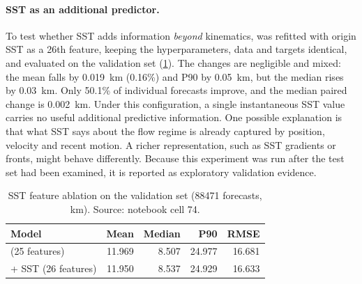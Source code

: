 \paragraph{SST as an additional predictor.} To test whether SST adds information \emph{beyond} kinematics, \GBH{} was refitted with origin SST as a 26th feature, keeping the hyperparameters, data and targets identical, and evaluated on the validation set (\cref{tab:sst}). The changes are negligible and mixed: the mean falls by \SI{0.019}{km} (0.16\%) and P90 by \SI{0.05}{km}, but the median rises by \SI{0.03}{km}. Only 50.1\% of individual forecasts improve, and the median paired change is \SI{0.002}{km}. Under this configuration, a single instantaneous SST value carries no useful additional predictive information. One possible explanation is that what SST says about the flow regime is already captured by position, velocity and recent motion. A richer representation, such as SST gradients or fronts, might behave differently. Because this experiment was run after the test set had been examined, it is reported as exploratory validation evidence.

\begin{table}[!htbp]
\centering
\caption{SST feature ablation on the validation set (\num{88471} forecasts, km). Source: notebook cell 74.}
\label{tab:sst}
\small
\begin{tabular}{@{}lrrrr@{}}
\toprule
Model & Mean & Median & P90 & RMSE \\
\midrule
\GBH{} (25 features)        & 11.969 & 8.507 & 24.977 & 16.681 \\
\GBH{} + SST (26 features)  & 11.950 & 8.537 & 24.929 & 16.633 \\
\bottomrule
\end{tabular}
\end{table}
